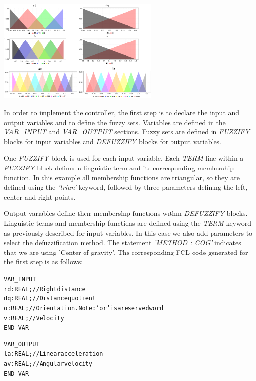 \documentclass[11pt,twoside]{article}
\begin{document}
\begin{multicols}{2}
\vspace*{5pt}
\centerline{\includegraphics[width=3.1in]{./figs/robot_vars_2.png}}
\vspace*{5pt}
\label{f:robotVars}
\vspace*{3pt}

In order to implement the controller, the first step is to declare the input and output variables and to define the fuzzy sets. Variables are defined in the \textit{VAR\_INPUT} and \textit{VAR\_OUTPUT} sections. Fuzzy sets are defined in \textit{FUZZIFY} blocks for input variables and \textit{DEFUZZIFY} blocks for output variables.

One \textit{FUZZIFY} block is used for each input variable. Each \textit{TERM} line within a \textit{FUZZIFY} block defines a linguistic term and its corresponding membership function.  In this example all membership functions are triangular, so they are defined using the \textit{'trian'} keyword, followed by three parameters defining the left, center and right points.

Output variables define their membership functions within \textit{DEFUZZIFY} blocks. Linguistic terms and membership functions are defined using the \textit{TERM} keyword as previously described for input variables. In this case we also add parameters to select the defuzzification method. The statement \textit{'METHOD : COG'} indicates that we are using 'Center of gravity'. The corresponding FCL code generated for the first step is as follows:

\vspace*{5pt}
\begin{scriptsize}
\begin{alltt}
VAR\_INPUT
	rd : REAL;			// Right distance
	dq : REAL;			// Distance quotient
	o  : REAL;			// Orientation. Note: 'or' is a reserved word
	v  : REAL;			// Velocity
END\_VAR

VAR\_OUTPUT
	la : REAL;			// Linear acceleration
	av : REAL;			// Angular velocity
END\_VAR


\end{alltt}
\end{scriptsize}
\end{multicols}
\end{document}
